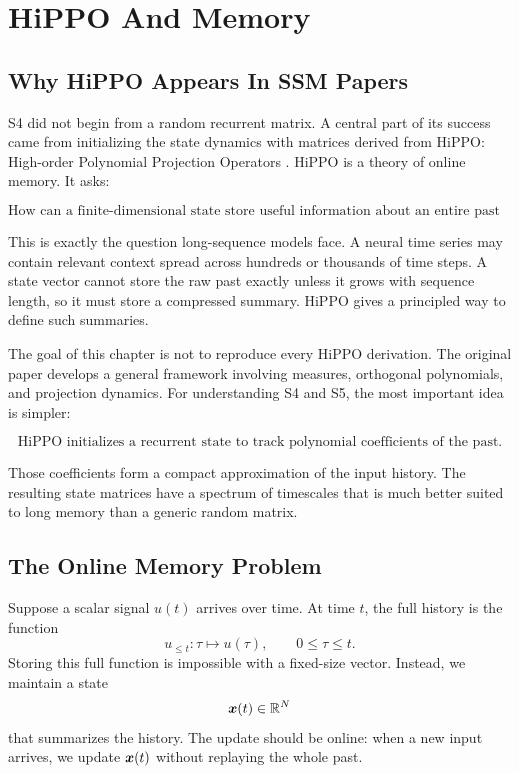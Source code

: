 \chapter{HiPPO And Memory}
\label{ch:hippo-and-memory}

\section{Why HiPPO Appears In SSM Papers}

S4 did not begin from a random recurrent matrix. A central part of its success came from
initializing the state dynamics with matrices derived from HiPPO: High-order Polynomial
Projection Operators \citep{gu2020hippo}. HiPPO is a theory of online memory. It asks:

\[
  \text{How can a finite-dimensional state store useful information about an entire past signal?}
\]

This is exactly the question long-sequence models face. A neural time series may contain
relevant context spread across hundreds or thousands of time steps. A state vector cannot
store the raw past exactly unless it grows with sequence length, so it must store a
compressed summary. HiPPO gives a principled way to define such summaries.

The goal of this chapter is not to reproduce every HiPPO derivation. The original paper
develops a general framework involving measures, orthogonal polynomials, and projection
dynamics. For understanding S4 and S5, the most important idea is simpler:

\[
  \text{HiPPO initializes a recurrent state to track polynomial coefficients of the past.}
\]

Those coefficients form a compact approximation of the input history. The resulting
state matrices have a spectrum of timescales that is much better suited to long memory
than a generic random matrix.

\section{The Online Memory Problem}

Suppose a scalar signal $u(t)$ arrives over time. At time $t$, the full history is the
function
\[
  u_{\leq t}: \tau \mapsto u(\tau), \qquad 0 \leq \tau \leq t.
\]
Storing this full function is impossible with a fixed-size vector. Instead, we maintain a
state
\[
  \bm{x}(t) \in \mathbb{R}^N
\]
that summarizes the history. The update should be online: when a new input arrives, we
update $\bm{x}(t)$ without replaying the whole past.

